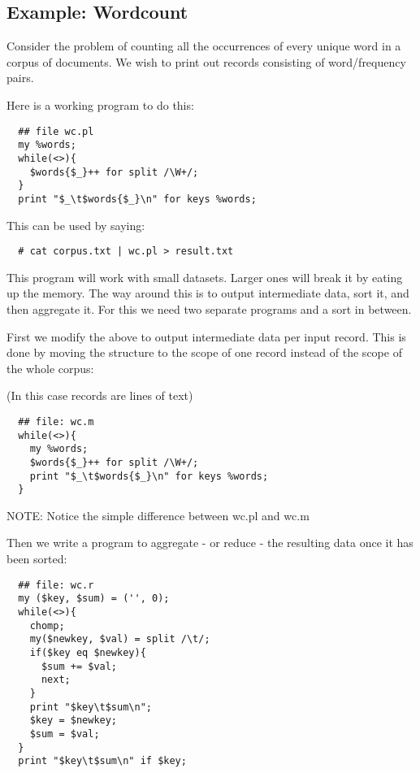 \documentclass{tufte-handout}
\begin{document}
\subsection*{Example: Wordcount\label{Example:_Wordcount}}


Consider the problem of counting all the occurrences of every unique word in a corpus of documents. We wish to print out records consisting of word/frequency pairs.



Here is a working program to do this:

\begin{verbatim}
  ## file wc.pl
  my %words;
  while(<>){
    $words{$_}++ for split /\W+/;
  }
  print "$_\t$words{$_}\n" for keys %words;
\end{verbatim}


This can be used by saying:

\begin{verbatim}
  # cat corpus.txt | wc.pl > result.txt
\end{verbatim}


This program will work with small datasets. Larger ones will break it by eating up the memory. The way around this is to output intermediate data, sort it, and then aggregate it. For this we need two separate programs and a sort in between.



First we modify the above to output intermediate data per input record. This is done by moving the structure to the scope of one record instead of the scope of the whole corpus:



(In this case records are lines of text)

\begin{verbatim}
  ## file: wc.m
  while(<>){
    my %words;
    $words{$_}++ for split /\W+/;
    print "$_\t$words{$_}\n" for keys %words;
  }
\end{verbatim}


NOTE: Notice the simple difference between wc.pl and wc.m



Then we write a program to aggregate - or reduce - the resulting data once it has been sorted:

\begin{verbatim}
  ## file: wc.r
  my ($key, $sum) = ('', 0);
  while(<>){
    chomp;
    my($newkey, $val) = split /\t/;
    if($key eq $newkey){
      $sum += $val;
      next;
    }
    print "$key\t$sum\n";
    $key = $newkey;
    $sum = $val;
  }
  print "$key\t$sum\n" if $key;
\end{verbatim}
\end{document}
